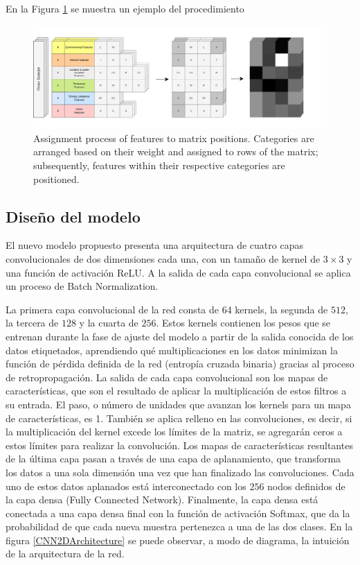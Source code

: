 \documentclass{uathesis-es}
\begin{document}
En la Figura \ref{MatrixConstruction} se muestra un ejemplo del procedimiento 

\begin{figure}[H]
    \centering
    \includegraphics[width=17cm]{Figures/Matrix Construction_2.png}
    \caption{Assignment process of features to matrix positions. Categories are arranged based on their weight and assigned to rows of the matrix; subsequently, features within their respective categories are positioned.}
    \label{MatrixConstruction}
\end{figure}

\subsection{Diseño del modelo}

El nuevo modelo propuesto presenta una arquitectura de cuatro capas convolucionales de dos dimensiones cada una, con un tamaño de kernel de $3 \times 3$ y una función de activación ReLU. A la salida de cada capa convolucional se aplica un proceso de Batch Normalization.

La primera capa convolucional de la red consta de 64 kernels, la segunda de $512$, la tercera de $128$ y la cuarta de $256$. Estos kernels contienen los pesos que se entrenan durante la fase de ajuste del modelo a partir de la salida conocida de los datos etiquetados, aprendiendo qué multiplicaciones en los datos minimizan la función de pérdida definida de la red (entropía cruzada binaria) gracias al proceso de retropropagación. La salida de cada capa convolucional son los mapas de características, que son el resultado de aplicar la multiplicación de estos filtros a su entrada. El paso, o número de unidades que avanzan los kernels para un mapa de características, es 1. También se aplica relleno en las convoluciones, es decir, si la multiplicación del kernel excede los límites de la matriz, se agregarán ceros a estos límites para realizar la convolución. Los mapas de características resultantes de la última capa pasan a través de una capa de aplanamiento, que transforma los datos a una sola dimensión una vez que han finalizado las convoluciones. Cada uno de estos datos aplanados está interconectado con los $256$ nodos definidos de la capa densa (Fully Connected Network). Finalmente, la capa densa está conectada a una capa densa final con la función de activación Softmax, que da la probabilidad de que cada nueva muestra pertenezca a una de las dos clases. En la figura \ref{CNN2DArchitecture} se puede observar, a modo de diagrama, la intuición de la arquitectura de la red.
\end{document}

